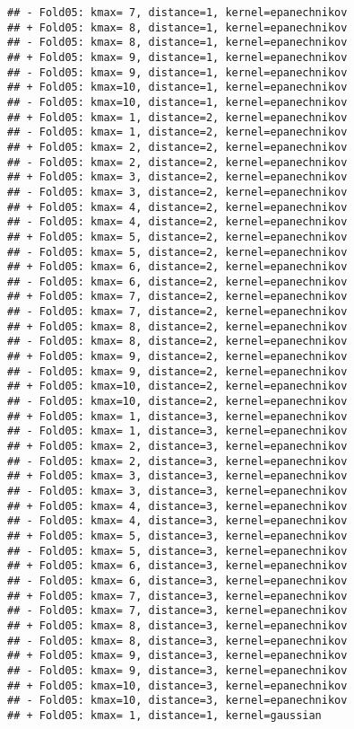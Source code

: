 \documentclass[
]{article}
\begin{document}
\begin{verbatim}
## - Fold05: kmax= 7, distance=1, kernel=epanechnikov 
## + Fold05: kmax= 8, distance=1, kernel=epanechnikov 
## - Fold05: kmax= 8, distance=1, kernel=epanechnikov 
## + Fold05: kmax= 9, distance=1, kernel=epanechnikov 
## - Fold05: kmax= 9, distance=1, kernel=epanechnikov 
## + Fold05: kmax=10, distance=1, kernel=epanechnikov 
## - Fold05: kmax=10, distance=1, kernel=epanechnikov 
## + Fold05: kmax= 1, distance=2, kernel=epanechnikov 
## - Fold05: kmax= 1, distance=2, kernel=epanechnikov 
## + Fold05: kmax= 2, distance=2, kernel=epanechnikov 
## - Fold05: kmax= 2, distance=2, kernel=epanechnikov 
## + Fold05: kmax= 3, distance=2, kernel=epanechnikov 
## - Fold05: kmax= 3, distance=2, kernel=epanechnikov 
## + Fold05: kmax= 4, distance=2, kernel=epanechnikov 
## - Fold05: kmax= 4, distance=2, kernel=epanechnikov 
## + Fold05: kmax= 5, distance=2, kernel=epanechnikov 
## - Fold05: kmax= 5, distance=2, kernel=epanechnikov 
## + Fold05: kmax= 6, distance=2, kernel=epanechnikov 
## - Fold05: kmax= 6, distance=2, kernel=epanechnikov 
## + Fold05: kmax= 7, distance=2, kernel=epanechnikov 
## - Fold05: kmax= 7, distance=2, kernel=epanechnikov 
## + Fold05: kmax= 8, distance=2, kernel=epanechnikov 
## - Fold05: kmax= 8, distance=2, kernel=epanechnikov 
## + Fold05: kmax= 9, distance=2, kernel=epanechnikov 
## - Fold05: kmax= 9, distance=2, kernel=epanechnikov 
## + Fold05: kmax=10, distance=2, kernel=epanechnikov 
## - Fold05: kmax=10, distance=2, kernel=epanechnikov 
## + Fold05: kmax= 1, distance=3, kernel=epanechnikov 
## - Fold05: kmax= 1, distance=3, kernel=epanechnikov 
## + Fold05: kmax= 2, distance=3, kernel=epanechnikov 
## - Fold05: kmax= 2, distance=3, kernel=epanechnikov 
## + Fold05: kmax= 3, distance=3, kernel=epanechnikov 
## - Fold05: kmax= 3, distance=3, kernel=epanechnikov 
## + Fold05: kmax= 4, distance=3, kernel=epanechnikov 
## - Fold05: kmax= 4, distance=3, kernel=epanechnikov 
## + Fold05: kmax= 5, distance=3, kernel=epanechnikov 
## - Fold05: kmax= 5, distance=3, kernel=epanechnikov 
## + Fold05: kmax= 6, distance=3, kernel=epanechnikov 
## - Fold05: kmax= 6, distance=3, kernel=epanechnikov 
## + Fold05: kmax= 7, distance=3, kernel=epanechnikov 
## - Fold05: kmax= 7, distance=3, kernel=epanechnikov 
## + Fold05: kmax= 8, distance=3, kernel=epanechnikov 
## - Fold05: kmax= 8, distance=3, kernel=epanechnikov 
## + Fold05: kmax= 9, distance=3, kernel=epanechnikov 
## - Fold05: kmax= 9, distance=3, kernel=epanechnikov 
## + Fold05: kmax=10, distance=3, kernel=epanechnikov 
## - Fold05: kmax=10, distance=3, kernel=epanechnikov 
## + Fold05: kmax= 1, distance=1, kernel=gaussian 

\end{verbatim}
\end{document}

